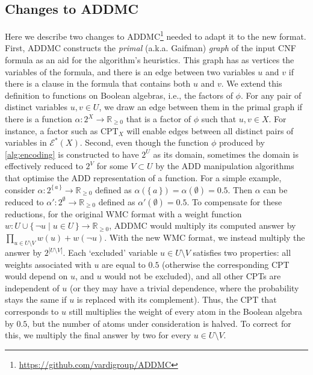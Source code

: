 \subsection{Changes to \textsc{ADDMC}}

Here we describe two changes to
\textsc{ADDMC}\footnote{\url{https://github.com/vardigroup/ADDMC}}
\citep{DBLP:conf/aaai/DudekPV20} needed to adapt it to the new format. First,
\textsc{ADDMC} constructs the \emph{primal} (a.k.a. Gaifman) \emph{graph} of the
input CNF formula as an aid for the algorithm's heuristics. This graph has as
vertices the variables of the formula, and there is an edge between two
variables $u$ and $v$ if there is a clause in the formula that contains both $u$
and $v$. We extend this definition to functions on Boolean algebras, i.e., the
factors of $\phi$. For any pair of distinct variables $u, v \in U$, we draw an
edge between them in the primal graph if there is a function
$\alpha\colon 2^X \to \mathbb{R}_{\ge 0}$ that is a factor of $\phi$ such that
$u, v \in X$. For instance, a factor such as $\mathrm{CPT}_X$ will enable edges
between all distinct pairs of variables in $\mathcal{E}^*(X)$. Second, even
though the function $\phi$ produced by \cref{alg:encoding} is constructed to
have $2^U$ as its domain, sometimes the domain is effectively reduced to $2^V$
for some $V \subset U$ by the ADD manipulation algorithms that optimise the ADD
representation of a function. For a simple example, consider
$\alpha: 2^{\{\, a \,\}} \to \mathbb{R}_{\ge 0}$ defined as
$\alpha(\{\, a \,\}) = \alpha(\emptyset) = 0.5$. Then $\alpha$ can be reduced to
$\alpha'\colon 2^{\emptyset} \to \mathbb{R}_{\ge 0}$ defined as
$\alpha'(\emptyset) = 0.5$. To compensate for these reductions, for the original
WMC format with a weight function
$w\colon U \cup \{\, \neg u \mid u \in U \,\} \to \mathbb{R}_{\ge 0}$,
\textsc{ADDMC} would multiply its computed answer by
$\prod_{u \in U \setminus V} w(u) + w(\neg u)$. With the new WMC format, we
instead multiply the answer by $2^{|U \setminus V|}$. Each `excluded' variable
$u \in U \setminus V$ satisfies two properties: all weights associated with $u$
are equal to $0.5$ (otherwise the corresponding CPT would depend on $u$, and $u$
would not be excluded), and all other CPTs are independent of $u$ (or they may
have a trivial dependence, where the probability stays the same if $u$ is
replaced with its complement). Thus, the CPT that corresponds to $u$ still
multiplies the weight of every atom in the Boolean algebra by $0.5$, but the
number of atoms under consideration is halved. To correct for this, we multiply
the final answer by two for every $u \in U \setminus V$.

